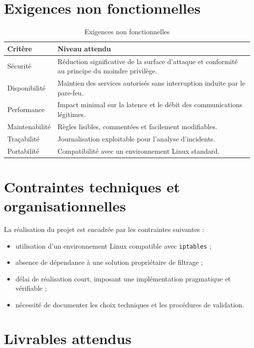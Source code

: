 \section{Exigences non fonctionnelles}

\begin{table}[H]
\centering
\caption{Exigences non fonctionnelles}
\begin{tabularx}{\textwidth}{|>{\raggedright\arraybackslash}p{3cm}|X|}
\hline
\rowcolor{gray!20}
\textbf{Critère} & \textbf{Niveau attendu} \\
\hline
Sécurité & Réduction significative de la surface d'attaque et conformité au principe du moindre privilège. \\
\hline
Disponibilité & Maintien des services autorisés sans interruption induite par le pare-feu. \\
\hline
Performance & Impact minimal sur la latence et le débit des communications légitimes. \\
\hline
Maintenabilité & Règles lisibles, commentées et facilement modifiables. \\
\hline
Traçabilité & Journalisation exploitable pour l'analyse d'incidents. \\
\hline
Portabilité & Compatibilité avec un environnement Linux standard. \\
\hline
\end{tabularx}
\end{table}

\section{Contraintes techniques et organisationnelles}

La réalisation du projet est encadrée par les contraintes suivantes :
\begin{itemize}
    \item utilisation d'un environnement Linux compatible avec \texttt{iptables} ;
    \item absence de dépendance à une solution propriétaire de filtrage ;
    \item délai de réalisation court, imposant une implémentation pragmatique et vérifiable ;
    \item nécessité de documenter les choix techniques et les procédures de validation.
\end{itemize}

\section{Livrables attendus}

